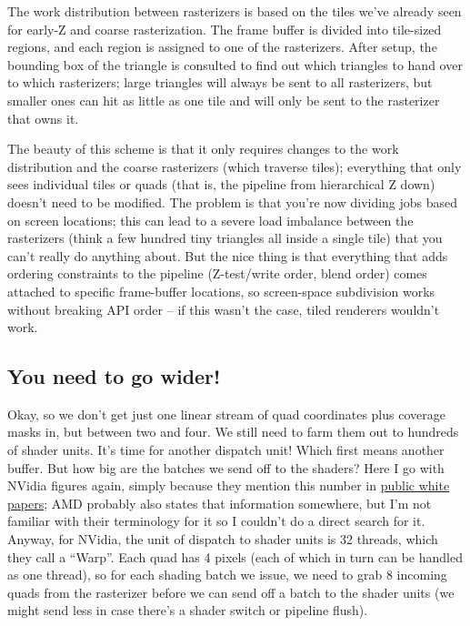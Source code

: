 \documentclass[12pt]{article}
\begin{document}
The work distribution between rasterizers is based on the tiles we’ve already seen for early-Z and coarse rasterization. The frame buffer is divided into tile-sized regions, and each region is assigned to one of the rasterizers. After setup, the bounding box of the triangle is consulted to find out which triangles to hand over to which rasterizers; large triangles will always be sent to all rasterizers, but smaller ones can hit as little as one tile and will only be sent to the rasterizer that owns it.

The beauty of this scheme is that it only requires changes to the work distribution and the coarse rasterizers (which traverse tiles); everything that only sees individual tiles or quads (that is, the pipeline from hierarchical Z down) doesn’t need to be modified. The problem is that you’re now dividing jobs based on screen locations; this can lead to a severe load imbalance between the rasterizers (think a few hundred tiny triangles all inside a single tile) that you can’t really do anything about. But the nice thing is that everything that adds ordering constraints to the pipeline (Z-test/write order, blend order) comes attached to specific frame-buffer locations, so screen-space subdivision works without breaking API order – if this wasn’t the case, tiled renderers wouldn’t work.

\subsection{You need to go wider!}
\label{sec:org504aab1}

Okay, so we don’t get just one linear stream of quad coordinates plus coverage masks in, but between two and four. We still need to farm them out to hundreds of shader units. It’s time for another dispatch unit! Which first means another buffer. But how big are the batches we send off to the shaders? Here I go with NVidia figures again, simply because they mention this number in \href{http://www.nvidia.com/content/PDF/fermi\_white\_papers/NVIDIA\_Fermi\_Compute\_Architecture\_Whitepaper.pdf}{public white papers}; AMD probably also states that information somewhere, but I’m not familiar with their terminology for it so I couldn’t do a direct search for it. Anyway, for NVidia, the unit of dispatch to shader units is 32 threads, which they call a “Warp”. Each quad has 4 pixels (each of which in turn can be handled as one thread), so for each shading batch we issue, we need to grab 8 incoming quads from the rasterizer before we can send off a batch to the shader units (we might send less in case there’s a shader switch or pipeline flush).
\end{document}
